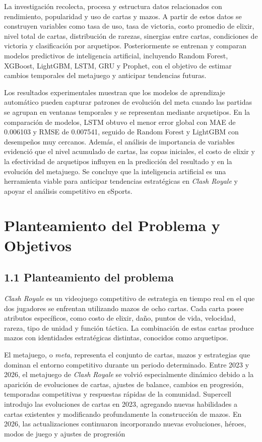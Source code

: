 \documentclass[
  spanish,
  12pt,
]{report}
\begin{document}
La investigación recolecta, procesa y estructura datos relacionados con
rendimiento, popularidad y uso de cartas y mazos. A partir de estos
datos se construyen variables como tasa de uso, tasa de victoria, costo
promedio de elixir, nivel total de cartas, distribución de rarezas,
sinergias entre cartas, condiciones de victoria y clasificación por
arquetipos. Posteriormente se entrenan y comparan modelos predictivos de
inteligencia artificial, incluyendo Random Forest, XGBoost, LightGBM,
LSTM, GRU y Prophet, con el objetivo de estimar cambios temporales del
metajuego y anticipar tendencias futuras.

Los resultados experimentales muestran que los modelos de aprendizaje
automático pueden capturar patrones de evolución del meta cuando las
partidas se agrupan en ventanas temporales y se representan mediante
arquetipos. En la comparación de modelos, LSTM obtuvo el menor error
global con MAE de 0.006103 y RMSE de 0.007541, seguido de Random Forest
y LightGBM con desempeños muy cercanos. Además, el análisis de
importancia de variables evidenció que el nivel acumulado de cartas, las
copas iniciales, el costo de elixir y la efectividad de arquetipos
influyen en la predicción del resultado y en la evolución del metajuego.
Se concluye que la inteligencia artificial es una herramienta viable
para anticipar tendencias estratégicas en \emph{Clash Royale} y apoyar
el análisis competitivo en eSports.

\newpage

\chapter{Planteamiento del Problema y
Objetivos}\label{planteamiento-del-problema-y-objetivos}

\section{1.1 Planteamiento del
problema}\label{planteamiento-del-problema}

\emph{Clash Royale} es un videojuego competitivo de estrategia en tiempo
real en el que dos jugadores se enfrentan utilizando mazos de ocho
cartas. Cada carta posee atributos específicos, como costo de elixir,
daño, puntos de vida, velocidad, rareza, tipo de unidad y función
táctica. La combinación de estas cartas produce mazos con identidades
estratégicas distintas, conocidos como arquetipos.

El metajuego, o \emph{meta}, representa el conjunto de cartas, mazos y
estrategias que dominan el entorno competitivo durante un periodo
determinado. Entre 2023 y 2026, el metajuego de \emph{Clash Royale} se
volvió especialmente dinámico debido a la aparición de evoluciones de
cartas, ajustes de balance, cambios en progresión, temporadas
competitivas y respuestas rápidas de la comunidad. Supercell introdujo
las evoluciones de cartas en 2023, agregando nuevas habilidades a cartas
existentes y modificando profundamente la construcción de mazos. En
2026, las actualizaciones continuaron incorporando nuevas evoluciones,
héroes, modos de juego y ajustes de progresión
\end{document}
